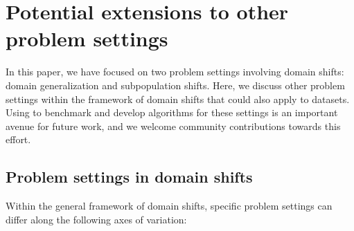 \section{Potential extensions to other problem settings}\label{sec:other_problems}
In this paper, we have focused on two problem settings involving domain shifts: domain generalization and subpopulation shifts.
Here, we discuss other problem settings within the framework of domain shifts that could also apply to \Wilds datasets.
Using \Wilds to benchmark and develop algorithms for these settings is an important avenue for future work, and we welcome community contributions towards this effort.

\subsection{Problem settings in domain shifts}
Within the general framework of domain shifts, specific problem settings can differ along the following axes of variation:
